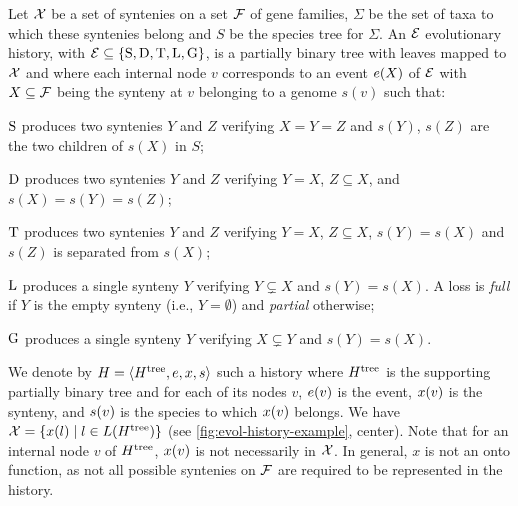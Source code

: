 \begin{definition}\label{def:superdtl:evol-model}
    Let \(\mathcal{X}\) be a set of syntenies on a set \(\mathcal{F}\) of gene families,
    \(\Sigma\) be the set of taxa to which these syntenies belong and \(S\) be the species tree for \(\Sigma\).
    An \(\mathcal{E}\) evolutionary history, with \(\mathcal{E} \subseteq \{\mathrm{S}, \mathrm{D}, \mathrm{T}, \mathrm{L}, \mathrm{G}\}\), is a partially binary tree with leaves mapped to \(\mathcal{X}\) and where each internal node \(v\) corresponds to an event \(e(X)\) of \(\mathcal{E}\) with \(X \subseteq \mathcal{F}\) being the synteny at \(v\) belonging to a genome \(s(v)\) such that:
    \begin{compactitemize}
	\item \(\mathrm{S}\) produces two syntenies \(Y\) and \(Z\) verifying \(X = Y = Z\) and \(s(Y)\), \(s(Z)\) are the two children of \(s(X)\) in \(S\);
	\item \(\mathrm{D}\) produces two syntenies \(Y\) and \(Z\) verifying \(Y = X\), \(Z \subseteq X\), and \(s(X) = s(Y) = s(Z)\);
	\item \(\mathrm{T}\) produces two syntenies \(Y\) and \(Z\) verifying \(Y = X\), \(Z \subseteq X\), \(s(Y) = s(X)\) and \(s(Z)\) is separated from \(s(X)\);
	\item \(\mathrm{L}\) produces a single synteny \(Y\) verifying \(Y \subsetneq X\) and \(s(Y) = s(X)\).
            A loss is \emph{full} if \(Y\) is the empty synteny (i.e., \(Y = \emptyset\)) and \emph{partial} otherwise;
	\item \(\mathrm{G}\) produces a single synteny \(Y\) verifying \(X \subsetneq Y\) and \(s(Y) = s(X)\). \qedhere
    \end{compactitemize}
\end{definition}

We denote by \(H = \left\langle H^\mathrm{tree}, e, x, s\right\rangle\) such a history where \(H^\mathrm{tree}\) is the supporting partially binary tree and for each of its nodes \(v\), \(e(v)\) is the event, \(x(v)\) is the synteny, and \(s(v)\) is the species to which \(x(v)\) belongs.
We have \(\mathcal{X} = \{x(l) \mid l \in L(H^\mathrm{tree})\}\) (see \cref{fig:evol-history-example}, center).
Note that for an internal node \(v\) of \(H^\mathrm{tree}\), \(x(v)\) is not necessarily in \(\mathcal{X}\). In general, \(x\) is not an onto function, as not all possible syntenies on \(\mathcal{F}\) are required to be represented in the history.


